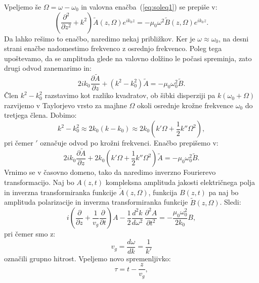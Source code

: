Vpeljemo še 
$\Omega =\omega - \omega_0$ in valovna enačba~(\ref{eq:soleq1}) se prepiše v: 
\begin{equation}
\left(\frac{\partial^2}{\partial z^2}+k^2\right)\tilde{A}(z,\Omega) e^{ik_0z} =
- \mu_{0}\omega^2 \tilde{B} (z,\Omega) e^{ik_0z}.
\end{equation}
Da lahko rešimo to enačbo, naredimo nekaj približkov. Ker je $\omega \approx \omega_0$, na desni strani
enačbe nadomestimo frekvenco z osrednjo frekvenco. Poleg tega upoštevamo, da se amplituda 
glede na valovno dolžino le počasi spreminja, zato drugi odvod zanemarimo in: 
\begin{equation}
2 i k_0 \frac{\partial \tilde{A}}{\partial z} + (k^2-k_0^2) \tilde{A} = - \mu_{0}\omega_0^2 \tilde{B}.
\end{equation}
Člen $k^2 - k_0^2$ razstavimo kot razliko kvadratov, ob šibki disperziji pa $k(\omega_0 + \Omega)$
razvijemo v Taylorjevo vrsto za majhne $\Omega$ 
okoli osrednje krožne frekvence $\omega_0$ do tretjega člena. Dobimo:
\begin{equation}
k^2 - k_0^2 \approx 2k_0 (k-k_0) \approx 2k_0 (k'\Omega + \frac{1}{2}k''\Omega^2),
\end{equation}
pri čemer $'$ označuje odvod po krožni frekvenci. Enačbo prepišemo v:
\begin{equation}
2 i k_0 \frac{\partial \tilde{A}}{\partial z} + 2k_0(k'\Omega + \frac{1}{2}k''\Omega^2) \tilde{A} 
= - \mu_{0}\omega_0^2 \tilde{B}.
\end{equation}
Vrnimo se v časovno domeno, tako da naredimo inverzno Fourierevo transformacijo. Naj bo 
$A(z,t)$ kompleksna amplituda jakosti električnega polja in inverzna transformiranka 
funkcije $\tilde{A}(z,\Omega)$, funkcija $B(z,t)$ pa naj bo 
amplituda polarizacije in inverzna transformiranka 
funkcije $\tilde{B}(z,\Omega)$.
Sledi:
\begin{equation}
i \left(\frac{\partial}{\partial z}+\frac{1}{v_{g}}\frac{\partial}{\partial t}\right)A-
\frac{1}{2}\frac{d^{2}k}{d\omega^{2}}\,\frac{\partial^{2}A}{\partial t^{2}}=
-\frac{\mu_0\omega_0^2}{2 k_0}B,
\label{8.93}
\end{equation}
pri čemer smo z:
\begin{equation}
 v_g = \frac{d\omega}{dk} = \frac{1}{k'}
\end{equation}
označili grupno hitrost.
Vpeljemo novo spremenljivko:
\begin{equation}
\tau=t-\frac{z}{v_{g}},
\label{nelinver}
\end{equation}
